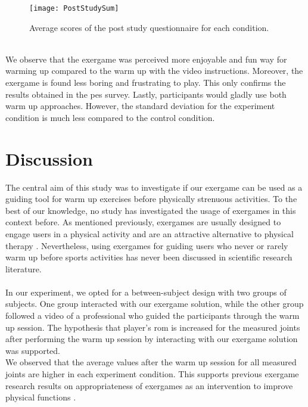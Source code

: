 \begin{figure}[h]
    \centering
    \texttt{[image: PostStudySum]}
    \caption{Average scores of the post study questionnaire for each condition.}
    \label{fig:poststudysum}
\end{figure}\\ We observe that the exergame was perceived more enjoyable and fun way for warming up compared to the warm up with the video instructions. Moreover, the exergame is found less boring and frustrating to play.  This only confirms the results obtained in the \acrshort{pes} survey. Lastly, participants would gladly use both warm up approaches. However, the standard deviation for the experiment condition is much less compared to the control condition.
\section{Discussion}
The central aim of this study was to investigate if our exergame can be used as a guiding tool for warm up exercises before physically strenuous activities. To the best of our knowledge, no study has investigated the usage of exergames in this context before. As mentioned previously, exergames are usually designed to engage users in a physical activity \cite{song2010effects, staiano2011exergames} and are an attractive alternative to physical therapy \cite{jansen2013serious}. Nevertheless, using exergames for guiding users who never or rarely warm up before sports activities has never been discussed in scientific research literature. \\\\
In our experiment, we opted for a between-subject design with two groups of subjects. One group interacted with our exergame solution, while the other group followed a video of a professional who guided the participants through the warm up session. The hypothesis that player's \acrshort{rom} is increased for the measured joints after performing the warm up session by interacting with our exergame solution was supported. \\We observed that the average values after the warm up session for all measured joints are higher in each experiment condition. This supports previous exergame research results on appropriateness  of exergames  as an intervention to improve physical functions \cite{skjaeret2016exercise}. %
